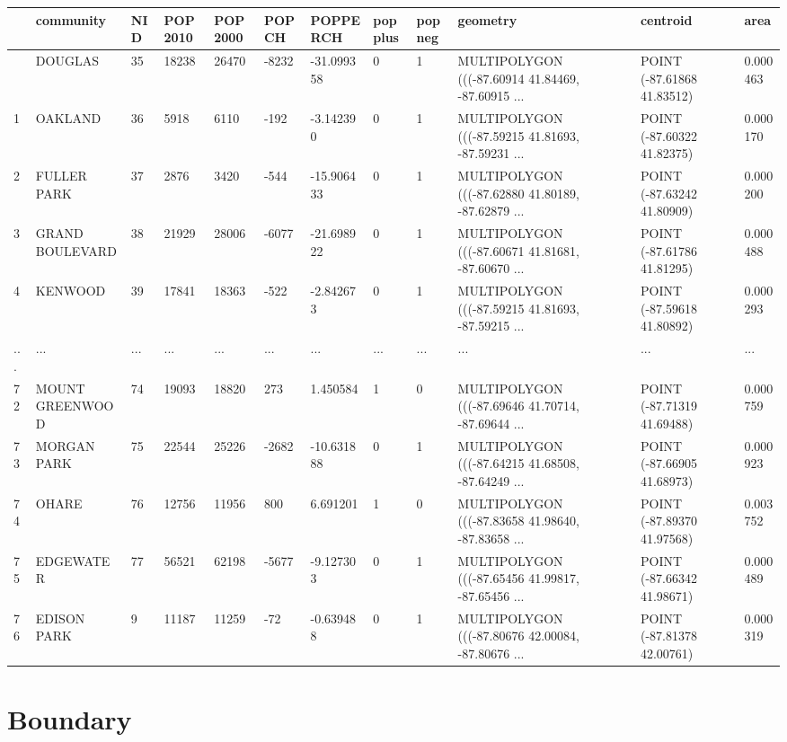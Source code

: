 \documentclass[
  letterpaper,
  DIV=11,
  numbers=noendperiod]{scrreprt}
\begin{document}
\begin{longtable}[]{@{}llllllllllll@{}}
\toprule\noalign{}
& community & NID & POP2010 & POP2000 & POPCH & POPPERCH & popplus &
popneg & geometry & centroid & area \\
\midrule\noalign{}
\endhead
\bottomrule\noalign{}
\endlastfoot
0 & DOUGLAS & 35 & 18238 & 26470 & -8232 & -31.099358 & 0 & 1 &
MULTIPOLYGON (((-87.60914 41.84469, -87.60915 ... & POINT (-87.61868
41.83512) & 0.000463 \\
1 & OAKLAND & 36 & 5918 & 6110 & -192 & -3.142390 & 0 & 1 & MULTIPOLYGON
(((-87.59215 41.81693, -87.59231 ... & POINT (-87.60322 41.82375) &
0.000170 \\
2 & FULLER PARK & 37 & 2876 & 3420 & -544 & -15.906433 & 0 & 1 &
MULTIPOLYGON (((-87.62880 41.80189, -87.62879 ... & POINT (-87.63242
41.80909) & 0.000200 \\
3 & GRAND BOULEVARD & 38 & 21929 & 28006 & -6077 & -21.698922 & 0 & 1 &
MULTIPOLYGON (((-87.60671 41.81681, -87.60670 ... & POINT (-87.61786
41.81295) & 0.000488 \\
4 & KENWOOD & 39 & 17841 & 18363 & -522 & -2.842673 & 0 & 1 &
MULTIPOLYGON (((-87.59215 41.81693, -87.59215 ... & POINT (-87.59618
41.80892) & 0.000293 \\
... & ... & ... & ... & ... & ... & ... & ... & ... & ... & ... & ... \\
72 & MOUNT GREENWOOD & 74 & 19093 & 18820 & 273 & 1.450584 & 1 & 0 &
MULTIPOLYGON (((-87.69646 41.70714, -87.69644 ... & POINT (-87.71319
41.69488) & 0.000759 \\
73 & MORGAN PARK & 75 & 22544 & 25226 & -2682 & -10.631888 & 0 & 1 &
MULTIPOLYGON (((-87.64215 41.68508, -87.64249 ... & POINT (-87.66905
41.68973) & 0.000923 \\
74 & OHARE & 76 & 12756 & 11956 & 800 & 6.691201 & 1 & 0 & MULTIPOLYGON
(((-87.83658 41.98640, -87.83658 ... & POINT (-87.89370 41.97568) &
0.003752 \\
75 & EDGEWATER & 77 & 56521 & 62198 & -5677 & -9.127303 & 0 & 1 &
MULTIPOLYGON (((-87.65456 41.99817, -87.65456 ... & POINT (-87.66342
41.98671) & 0.000489 \\
76 & EDISON PARK & 9 & 11187 & 11259 & -72 & -0.639488 & 0 & 1 &
MULTIPOLYGON (((-87.80676 42.00084, -87.80676 ... & POINT (-87.81378
42.00761) & 0.000319 \\
\end{longtable}

\hypertarget{boundary}{%
\section{Boundary}\label{boundary}}
\end{document}
